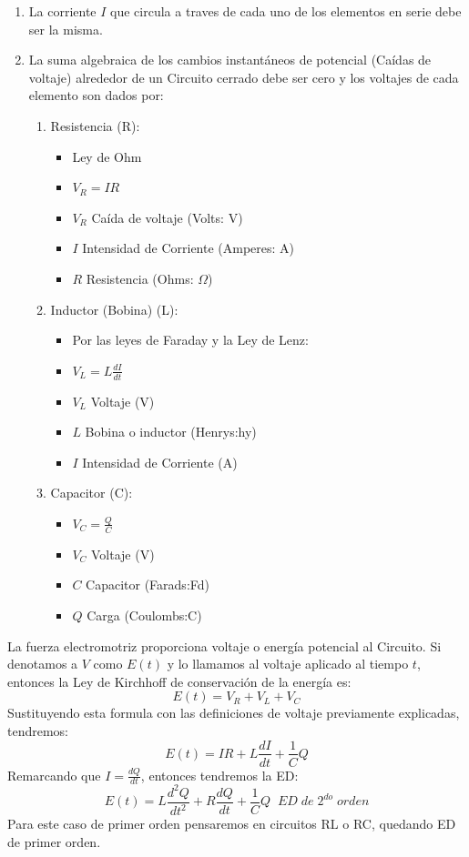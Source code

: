 \documentclass[10pt]{article}
\begin{document}
\begin{enumerate}
  \item La corriente $I$ que circula a traves de cada uno de los elementos en serie debe ser la misma.
  \item La suma algebraica de los cambios instantáneos de potencial (Caídas de voltaje) alrededor de un Circuito cerrado debe ser cero y los voltajes de cada elemento son dados por:
  \begin{enumerate}
    \item Resistencia (R):
    \begin{itemize}
      \item Ley de Ohm
      \item \(\displaystyle V_{R}=IR \)
      \item \(\displaystyle V_{R}\) Caída de voltaje (Volts: V)
      \item \(\displaystyle I\) Intensidad de Corriente (Amperes: A)
      \item \(\displaystyle R\) Resistencia (Ohms: $\Omega$)
    \end{itemize}
    \item Inductor (Bobina) (L):
    \begin{itemize}
      \item Por las leyes de Faraday y la Ley de Lenz:
      \item \(\displaystyle V_{L}=L\frac{dI}{dt} \)
      \item \(\displaystyle V_{L}\) Voltaje (V)
      \item \(\displaystyle L\) Bobina o inductor (Henrys:hy)
      \item \(\displaystyle I\) Intensidad de Corriente (A)
    \end{itemize}
    \item Capacitor (C):
    \begin{itemize}
      \item \(\displaystyle V_{C}=\frac{Q}{C}\)
      \item \(\displaystyle V_{C}\) Voltaje (V)
      \item \(\displaystyle C\) Capacitor (Farads:Fd)
      \item \(\displaystyle Q\) Carga (Coulombs:C)
    \end{itemize}
  \end{enumerate}
\end{enumerate}
La fuerza electromotriz proporciona voltaje o energía potencial al Circuito. Si denotamos a $V$ como $E(t)$ y lo llamamos al voltaje  aplicado al tiempo $t$, entonces la Ley de Kirchhoff de conservación de la energía es:
\[E(t)=V_{R}+V_{L}+V_{C}\]
Sustituyendo esta formula con las definiciones de voltaje previamente explicadas, tendremos:
\[E(t)=IR+L\frac{dI}{dt}+\frac{1}{C}Q\]
Remarcando que \(\displaystyle I=\frac{dQ}{dt}\), entonces tendremos la ED:
\[E(t)=L\frac{d^{2}Q}{dt^{2}}+R\frac{dQ}{dt}+\frac{1}{C}Q\;\;ED\;de\;2^{do}\;orden\]
Para este caso de primer orden pensaremos en circuitos RL o RC, quedando ED de primer orden.
\end{document}
